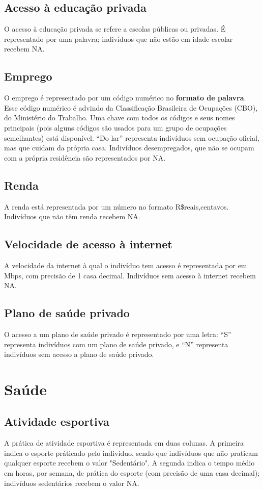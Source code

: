 \documentclass{book}
\begin{document}
\subsection{Acesso à educação privada}
O acesso à educação privada se refere a escolas públicas ou privadas. É representado por uma palavra; indivíduos que não estão em idade escolar recebem NA.

\subsection{Emprego}
O emprego é representado por um código numérico no \textbf{formato de palavra}. Esse código numérico é advindo da Classificação Brasileira de Ocupações (CBO), do Ministério do Trabalho. Uma chave com todos os códigos e seus nomes principais (pois alguns códigos são usados para um grupo de ocupações semelhantes) está disponível. ``Do lar'' representa indivíduos sem ocupação oficial, mas que cuidam da própria casa. Indivíduos desempregados, que não se ocupam com a própria residência são representados por NA.

\subsection{Renda}
A renda está representada por um número no formato R\$reais,centavos. Indivíduos que não têm renda recebem NA.

\subsection{Velocidade de acesso à internet}
A velocidade da internet à qual o indivíduo tem acesso é representada por em Mbps, com precisão de 1 casa decimal. Indivíduos sem acesso à internet recebem NA.

\subsection{Plano de saúde privado}
O acesso a um plano de saúde privado é representado por uma letra: ``S'' representa indivíduos com um plano de saúde privado, e ``N'' representa indivíduos sem acesso a plano de saúde privado.

\section{Saúde}

\subsection{Atividade esportiva}
A prática de atividade esportiva é representada em duas colunas. A primeira indica o esporte práticado pelo indivíduo, sendo que indivíduos que não praticam qualquer esporte recebem o valor "Sedentário". A segunda indica o tempo médio em horas, por semana, de prática do esporte (com precisão de uma casa decimal); indivíduos sedentários recebem o valor NA.
\end{document}
